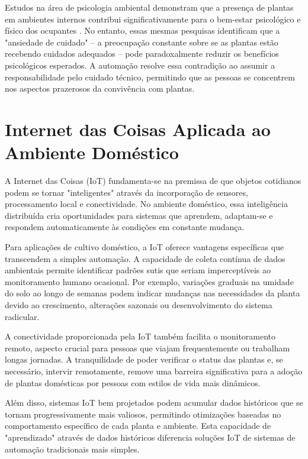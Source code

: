 \documentclass[twoside,english,brazilian]{UNISINOSmonografia}
\begin{document}
Estudos na área de psicologia ambiental demonstram que a presença de plantas em ambientes internos contribui significativamente para o bem-estar psicológico e físico dos ocupantes \cite{silva2019}. No entanto, essas mesmas pesquisas identificam que a "ansiedade de cuidado" – a preocupação constante sobre se as plantas estão recebendo cuidados adequados – pode paradoxalmente reduzir os benefícios psicológicos esperados. A automação resolve essa contradição ao assumir a responsabilidade pelo cuidado técnico, permitindo que as pessoas se concentrem nos aspectos prazerosos da convivência com plantas.


\section{Internet das Coisas Aplicada ao Ambiente Doméstico}

A Internet das Coisas (IoT) fundamenta-se na premissa de que objetos cotidianos podem se tornar "inteligentes" através da incorporação de sensores, processamento local e conectividade. No ambiente doméstico, essa inteligência distribuída cria oportunidades para sistemas que aprendem, adaptam-se e respondem automaticamente às condições em constante mudança.

Para aplicações de cultivo doméstico, a IoT oferece vantagens específicas que transcendem a simples automação. A capacidade de coleta contínua de dados ambientais permite identificar padrões sutis que seriam imperceptíveis ao monitoramento humano ocasional. Por exemplo, variações graduais na umidade do solo ao longo de semanas podem indicar mudanças nas necessidades da planta devido ao crescimento, alterações sazonais ou desenvolvimento do sistema radicular.

A conectividade proporcionada pela IoT também facilita o monitoramento remoto, aspecto crucial para pessoas que viajam frequentemente ou trabalham longas jornadas. A tranquilidade de poder verificar o status das plantas e, se necessário, intervir remotamente, remove uma barreira significativa para a adoção de plantas domésticas por pessoas com estilos de vida mais dinâmicos.

Além disso, sistemas IoT bem projetados podem acumular dados históricos que se tornam progressivamente mais valiosos, permitindo otimizações baseadas no comportamento específico de cada planta e ambiente. Esta capacidade de "aprendizado" através de dados históricos diferencia soluções IoT de sistemas de automação tradicionais mais simples.
\end{document}
